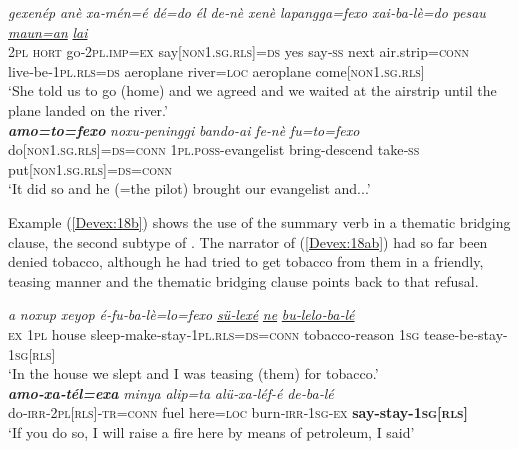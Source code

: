 \documentclass[output=paper]{LSP/langsci}
\begin{document}
	
\begin{exe}
\ex \label{Devex:17ab}
\begin{xlist}
\ex \label{Devex:17a}			     
\gll \textit{gexenép} \textit{anè} \textit{xa‑mén=é} \textit{dé=do} \textit{él} \textit{de‑nè} \textit{xenè} \textit{lapangga=fexo} \textit{xai‑ba‑lè=do} \textit{pesau} 	\underline{\textit{maun=an}}	\underline{\textit{}} \underline{\textit{lai}} \\
\textsc{2pl} \textsc{hort} go‑\textsc{2pl.imp=ex} say[\textsc{non1.sg.rls}]=\textsc{ds} yes say‑\textsc{ss}	next air.strip=\textsc{conn} live‑be‑\textsc{1pl.rls=ds} aeroplane river=\textsc{loc} aeroplane come[\textsc{non1.sg.rls}]\\
\glt `She told us to go (home) and we agreed and we waited at the airstrip until the plane landed on the river.'\\
 
\ex \label{Devex:17b}			     
\gll \textbf{\textit{amo=to=fexo}} \textit{noxu-peninggi} \textit{bando-ai} \textit{fe‑nè} \textit{fu=to=fexo} \\       
do[\textsc{non1.sg.rls}]=\textsc{ds=conn}	\textsc{1pl.poss}-evangelist bring-descend take‑\textsc{ss} put[\textsc{non1.sg.rls}]=\textsc{ds=conn}\\
\glt `It did so and he (=the pilot) brought our evangelist and...'\\
\end{xlist}
\end{exe}

Example (\ref{Devex:18b}) shows the use of the summary verb in a thematic bridging clause, the second subtype of . The narrator of (\ref{Devex:18ab}) had so far been denied tobacco, although he had tried to get tobacco from them in a friendly, teasing manner and the thematic bridging clause points back to that refusal. 


\begin{exe}
\ex \label{Devex:18ab}
\begin{xlist}
\ex \label{Devex:18a}			     
\gll \textit{a} \textit{noxup} \textit{xeyop} \textit{é‑fu‑ba‑lè=lo=fexo} \underline{\textit{sü‑lexé}} \underline{\textit{ne}} \underline{\textit{bu‑lelo‑ba‑lé}}\\
\textsc{ex} \textsc{1pl} house sleep‑make‑stay‑\textsc{1pl.rls=ds=conn} tobacco‑reason	\textsc{1sg} tease‑be‑stay-\textsc{1sg[rls]} \\ 
\glt `In the house we slept and I was teasing (them) for tobacco.'\\

\ex \label{Devex:18b}			     
\gll \textbf{\textit{amo‑xa‑tél=exa}} \textit{minya} \textit{alip=ta} \textit{alü‑xa‑léf-é} \textit{de‑ba‑lé}	 \\      		
do‑\textsc{irr‑2pl[rls]‑tr=conn}	fuel here=\textsc{loc} burn‑\textsc{irr‑1sg‑ex} \textbf{say-stay-\textsc{1sg[rls]}}  \\
\glt `If you do so, I will raise a fire here by means of petro­leum, I said'\\
\end{xlist}
\end{exe}
\end{document}
